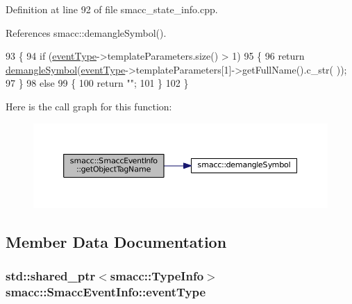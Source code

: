 Definition at line 92 of file smacc\+\_\+state\+\_\+info.\+cpp.



References smacc\+::demangle\+Symbol().


\begin{DoxyCode}
93 \{
94     \textcolor{keywordflow}{if} (\hyperlink{structsmacc_1_1SmaccEventInfo_a42df97fc9a9a817ca841427358002930}{eventType}->templateParameters.size() > 1)
95     \{
96         \textcolor{keywordflow}{return} \hyperlink{namespacesmacc_a458f5e70d468824fbcd66cc7729deaa8}{demangleSymbol}(\hyperlink{structsmacc_1_1SmaccEventInfo_a42df97fc9a9a817ca841427358002930}{eventType}->templateParameters[1]->getFullName().c\_str(
      ));
97     \}
98     \textcolor{keywordflow}{else}
99     \{
100         \textcolor{keywordflow}{return} \textcolor{stringliteral}{""};
101     \}
102 \}
\end{DoxyCode}


Here is the call graph for this function\+:
\nopagebreak
\begin{figure}[H]
\begin{center}
\leavevmode
\includegraphics[width=350pt]{structsmacc_1_1SmaccEventInfo_a0aa5d15822e7642079f375ee0f4ff096_cgraph}
\end{center}
\end{figure}




\subsection{Member Data Documentation}
\subsubsection[{\texorpdfstring{event\+Type}{eventType}}]{\setlength{\rightskip}{0pt plus 5cm}std\+::shared\+\_\+ptr$<${\bf smacc\+::\+Type\+Info}$>$ smacc\+::\+Smacc\+Event\+Info\+::event\+Type}\hypertarget{structsmacc_1_1SmaccEventInfo_a42df97fc9a9a817ca841427358002930}{}\label{structsmacc_1_1SmaccEventInfo_a42df97fc9a9a817ca841427358002930}


